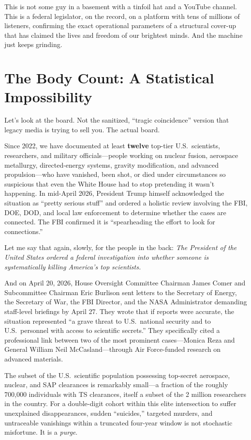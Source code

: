 \documentclass[11pt,a4paper]{article}
\begin{document}
This is not some guy in a basement with a tinfoil hat and a YouTube channel. This is a federal legislator, on the record, on a platform with tens of millions of listeners, confirming the exact operational parameters of a structural cover-up that has claimed the lives and freedom of our brightest minds. And the machine just keeps grinding.

\section{The Body Count: A Statistical Impossibility}

Let's look at the board. Not the sanitized, ``tragic coincidence'' version that legacy media is trying to sell you. The actual board.

Since 2022, we have documented at least \textbf{twelve} top-tier U.S.\ scientists, researchers, and military officials---people working on nuclear fusion, aerospace metallurgy, directed-energy systems, gravity modification, and advanced propulsion---who have vanished, been shot, or died under circumstances so suspicious that even the White House had to stop pretending it wasn't happening. In mid-April 2026, President Trump himself acknowledged the situation as ``pretty serious stuff'' and ordered a holistic review involving the FBI, DOE, DOD, and local law enforcement to determine whether the cases are connected. The FBI confirmed it is ``spearheading the effort to look for connections.''

Let me say that again, slowly, for the people in the back: \textit{The President of the United States ordered a federal investigation into whether someone is systematically killing America's top scientists.}

And on April 20, 2026, House Oversight Committee Chairman James Comer and Subcommittee Chairman Eric Burlison sent letters to the Secretary of Energy, the Secretary of War, the FBI Director, and the NASA Administrator demanding staff-level briefings by April 27. They wrote that if reports were accurate, the situation represented ``a grave threat to U.S.\ national security and to U.S.\ personnel with access to scientific secrets.'' They specifically cited a professional link between two of the most prominent cases---Monica Reza and General William Neil McCasland---through Air Force-funded research on advanced materials.

The subset of the U.S.\ scientific population possessing top-secret aerospace, nuclear, and SAP clearances is remarkably small---a fraction of the roughly 700,000 individuals with TS clearances, itself a subset of the 2 million researchers in the country. For a double-digit cohort within this elite intersection to suffer unexplained disappearances, sudden ``suicides,'' targeted murders, and untraceable vanishings within a truncated four-year window is not stochastic misfortune. It is a \textit{purge}.
\end{document}
